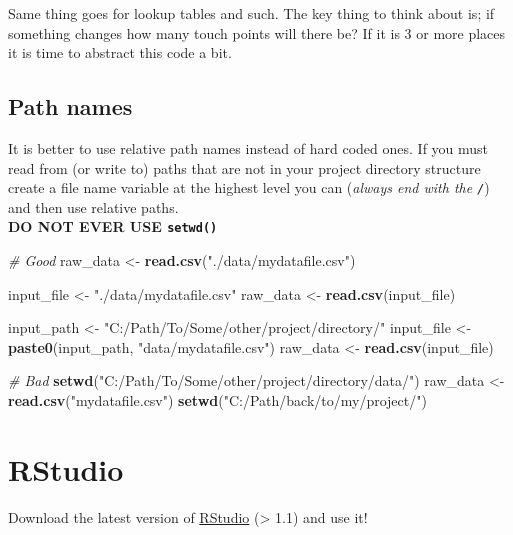 \documentclass[]{book}
\newenvironment{Shaded}{\begin{snugshade}}{\end{snugshade}}
\newcommand{\KeywordTok}[1]{\textcolor[rgb]{0.13,0.29,0.53}{\textbf{#1}}}
\newcommand{\StringTok}[1]{\textcolor[rgb]{0.31,0.60,0.02}{#1}}
\newcommand{\CommentTok}[1]{\textcolor[rgb]{0.56,0.35,0.01}{\textit{#1}}}
\newcommand{\NormalTok}[1]{#1}
\theoremstyle{definition}
\theoremstyle{definition}
\theoremstyle{definition}
\theoremstyle{remark}
\begin{document}
Same thing goes for lookup tables and such. The key thing to think about
is; if something changes how many touch points will there be? If it is 3
or more places it is time to abstract this code a bit.

\subsection{Path names}\label{path-names}

It is better to use relative path names instead of hard coded ones. If
you must read from (or write to) paths that are not in your project
directory structure create a file name variable at the highest level you
can (\emph{always end with the \texttt{/}}) and then use relative
paths.\\
\textbf{DO NOT EVER USE \texttt{setwd()}}

\begin{Shaded}
\begin{Highlighting}[]
\CommentTok{# Good}
\NormalTok{raw_data <-}\StringTok{ }\KeywordTok{read.csv}\NormalTok{(}\StringTok{"./data/mydatafile.csv"}\NormalTok{) }

\NormalTok{input_file <-}\StringTok{ "./data/mydatafile.csv"}
\NormalTok{raw_data <-}\StringTok{ }\KeywordTok{read.csv}\NormalTok{(input_file)  }

\NormalTok{input_path <-}\StringTok{ "C:/Path/To/Some/other/project/directory/"}
\NormalTok{input_file <-}\StringTok{ }\KeywordTok{paste0}\NormalTok{(input_path, }\StringTok{"data/mydatafile.csv"}\NormalTok{)}
\NormalTok{raw_data <-}\StringTok{ }\KeywordTok{read.csv}\NormalTok{(input_file)}

\CommentTok{# Bad}
\KeywordTok{setwd}\NormalTok{(}\StringTok{"C:/Path/To/Some/other/project/directory/data/"}\NormalTok{)}
\NormalTok{raw_data <-}\StringTok{ }\KeywordTok{read.csv}\NormalTok{(}\StringTok{"mydatafile.csv"}\NormalTok{)}
\KeywordTok{setwd}\NormalTok{(}\StringTok{"C:/Path/back/to/my/project/"}\NormalTok{)}
\end{Highlighting}
\end{Shaded}

\section{RStudio}\label{rstudio}

Download the latest version of
\href{https://www.rstudio.com/products/rstudio/download/\#download}{RStudio}
(\textgreater{} 1.1) and use it!
\end{document}
